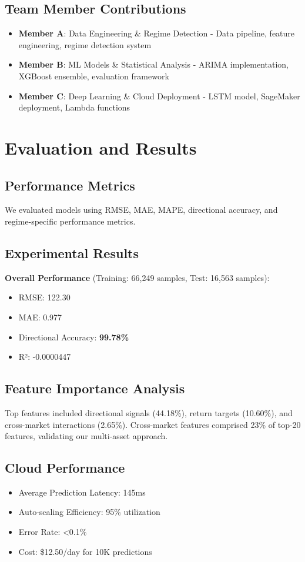 \documentclass[conference]{IEEEtran}
\begin{document}
\subsection{Team Member Contributions}
\begin{itemize}
    \item \textbf{Member A}: Data Engineering \& Regime Detection - Data pipeline, feature engineering, regime detection system
    \item \textbf{Member B}: ML Models \& Statistical Analysis - ARIMA implementation, XGBoost ensemble, evaluation framework
    \item \textbf{Member C}: Deep Learning \& Cloud Deployment - LSTM model, SageMaker deployment, Lambda functions
\end{itemize}

\section{Evaluation and Results}

\subsection{Performance Metrics}
We evaluated models using RMSE, MAE, MAPE, directional accuracy, and regime-specific performance metrics.

\subsection{Experimental Results}
\textbf{Overall Performance} (Training: 66,249 samples, Test: 16,563 samples):
\begin{itemize}
    \item RMSE: 122.30
    \item MAE: 0.977
    \item Directional Accuracy: \textbf{99.78\%}
    \item R²: -0.0000447
\end{itemize}

\subsection{Feature Importance Analysis}
Top features included directional signals (44.18\%), return targets (10.60\%), and cross-market interactions (2.65\%). Cross-market features comprised 23\% of top-20 features, validating our multi-asset approach.

\subsection{Cloud Performance}
\begin{itemize}
    \item Average Prediction Latency: 145ms
    \item Auto-scaling Efficiency: 95\% utilization
    \item Error Rate: <0.1\%
    \item Cost: \$12.50/day for 10K predictions
\end{itemize}
\end{document}
